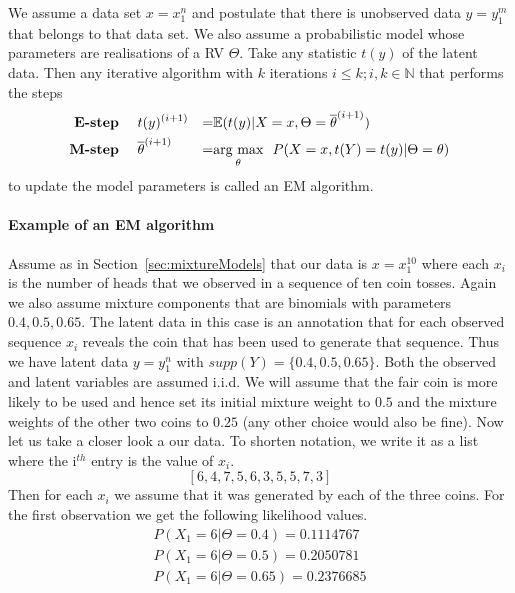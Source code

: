 \begin{Definition}[EM algorithm]\label{def:EM}
We assume a data set $ x = x_{1}^{n} $ and postulate that there is unobserved data $ y = y_{1}^{m} $ that belongs to that data set. We also
assume a probabilistic model whose parameters are realisations of a RV $ \Theta $. Take any
statistic $ t(y) $ of the latent data. Then any iterative algorithm with $ k $ iterations $ i \leq k; i,k \in \mathbb{N} $ that performs the steps
\begin{align*}
\mbox{\textbf{E-step} }~~~& t(y)^{(i+1)} &=& \mathbb{E}(t(y)|X = x, \Theta = \overline{\theta}^{(i+1)}) \\
\mbox{\textbf{M-step} }~~~& \overline{\theta}^{(i+1)} &=& \underset{\theta}{\mbox{arg max}}~~P(X=x, t(Y) = t(y)|\Theta = \theta) 
\end{align*}
to update the model parameters is called an EM algorithm.
\end{Definition}

\paragraph{Example of an EM algorithm} Assume as in Section~\ref{sec:mixtureModels} that our data is $ x=x^{10}_{1} $ where each $ x_{i} $ is the 
number of heads that we observed in a sequence of ten coin tosses. Again we also assume mixture components that are binomials with parameters
$ 0.4, 0.5, 0.65 $. The latent data in this case is an annotation that for each observed sequence $ x_{i} $ reveals the coin that has been used
to generate that sequence. Thus we have latent data $ y=y_{1}^{n} $ with $ supp(Y) = \{0.4,0.5,0.65\} $. Both the observed and latent variables
are assumed i.i.d.
We will assume that the fair coin is more likely to be used and hence set its initial mixture weight to $ 0.5 $ and the mixture weights of the 
other two coins to $ 0.25 $ (any other choice would also be fine). Now let 
us take a closer look a our data. To shorten notation, we write it as a list where the i$ ^{th} $ entry is the value of $ x_{i} $.
$$ [6, 4, 7, 5, 6, 3, 5, 5, 7, 3] $$
Then for each $ x_{i} $ we assume that it was generated by each of the three coins. For the first observation we get the following likelihood values.
\begin{align}
&P(X_{1}=6|\Theta=0.4) = 0.1114767& \\
&P(X_{1}=6|\Theta=0.5) = 0.2050781& \nonumber \\ 
&P(X_{1}=6|\Theta=0.65) = 0.2376685& \nonumber
\end{align}

